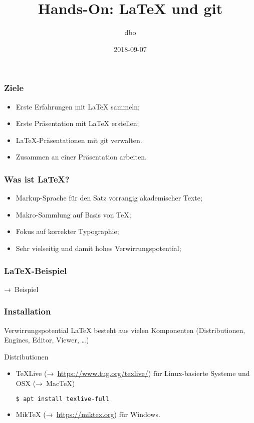 \documentclass{cms-kurs}
\title{Hands-On: \LaTeX{} und git}
\author{dbo}
\date{2018-09-07}
\begin{document}
\begin{frame}
  \frametitle{Ziele}

  \onslide<+->

  \begin{itemize}
  \item Erste Erfahrungen mit \LaTeX{} sammeln;
  \item Erste Präsentation mit \LaTeX{} erstellen;
  \item \LaTeX{}-Präsentationen mit git verwalten.
  \item Zusammen an einer Präsentation arbeiten.
  \end{itemize}

\end{frame}

\begin{frame}
  \frametitle{Was ist \LaTeX?}

  \onslide<+->

  \begin{itemize}
  \item Markup-Sprache für den Satz vorrangig akademischer Texte;
  \item Makro-Sammlung auf Basis von \TeX{};
  \item Fokus auf korrekter Typographie;
  \item Sehr vielseitig und damit hohes Verwirrungspotential;
  \end{itemize}

\end{frame}

\begin{frame}
  \frametitle{\LaTeX{}-Beispiel}

  \onslide<+->

  → Beispiel

\end{frame}

\begin{frame}[fragile]
  \frametitle{Installation}

  \onslide<+->

  \begin{block}{Verwirrungspotential}
    \LaTeX{} besteht aus vielen Komponenten (Distributionen, Engines, Editor,
    Viewer, \ldots)
  \end{block}

  \onslide<+->

  \bigskip{}

  \begin{block}{Distributionen}
    \begin{itemize}
    \item \TeX{}Live (→ \url{https://www.tug.org/texlive/}) für
      Linux-basierte Systeme und OSX (→ Mac\TeX)
\begin{lstlisting}[language=Bash]
$ apt install texlive-full
\end{lstlisting}
    \item Mik\TeX{} (→ \url{https://miktex.org}) für Windows.
    \end{itemize}
  \end{block}

\end{frame}
\end{document}
